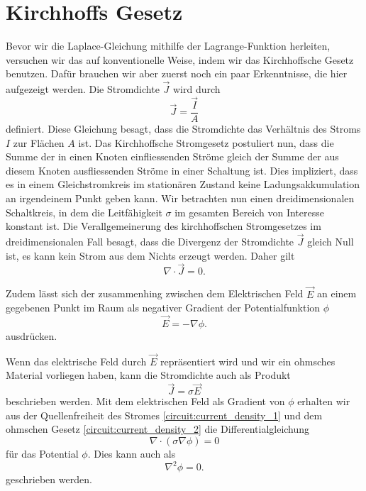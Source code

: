 %
%
%
%
\section{Kirchhoffs Gesetz
\label{circuit:section:teil1}}
Bevor wir die Laplace-Gleichung mithilfe der Lagrange-Funktion herleiten, versuchen wir das auf konventionelle Weise, indem wir  das Kirchhoffsche Gesetz benutzen. 
Dafür brauchen wir aber zuerst noch ein paar Erkenntnisse, die hier aufgezeigt werden. Die Stromdichte $\vec{J}$ wird durch
\begin{equation}
	\vec{J}=\frac{\vec{I}}{A}
	\label{circuit:current_density_3}
\end{equation}
definiert. Diese Gleichung besagt, dass die Stromdichte das Verhältnis des Stroms $I$ zur Flächen $A$ ist. 
Das Kirchhoffsche Stromgesetz postuliert nun, dass die Summe der in einen Knoten einfliessenden Ströme gleich der Summe der aus diesem Knoten ausfliessenden Ströme in einer Schaltung ist. Dies impliziert, dass es in einem Gleichstromkreis im stationären Zustand keine Ladungsakkumulation an irgendeinem Punkt geben kann. Wir betrachten nun einen dreidimensionalen Schaltkreis, in dem die Leitfähigkeit $\sigma$ im gesamten Bereich von Interesse konstant ist. Die Verallgemeinerung des kirchhoffschen Stromgesetzes im dreidimensionalen Fall besagt, dass die Divergenz der Stromdichte $\vec{J}$ gleich Null ist, es kann kein Strom aus dem Nichts erzeugt werden. Daher gilt 
\begin{equation}
	\nabla \cdot  \vec{J}=0.
	\label{circuit:current_density_1}
\end{equation}

Zudem lässt sich der zusammenhing zwischen dem Elektrischen Feld $\vec{E}$ an einem gegebenen Punkt im Raum als negativer Gradient der Potentialfunktion $\phi$ 
\begin{equation}
	\vec{E}=-\nabla \phi.
	\label{circuit:current_density_4}
\end{equation}
ausdrücken.

Wenn das elektrische Feld durch $\vec{E}$ repräsentiert wird und wir ein ohmsches Material vorliegen haben, kann die Stromdichte auch als Produkt  
\begin{equation}
\vec{J}=\sigma \vec{E}
\label{circuit:current_density_2}
\end{equation}
beschrieben werden.
Mit dem elektrischen Feld als Gradient von $\phi$ erhalten wir aus der Quellenfreiheit des Stromes \eqref{circuit:current_density_1} und dem ohmschen Gesetz \eqref{circuit:current_density_2} die Differentialgleichung 
\begin{equation}
	\nabla \cdot (\sigma \nabla \phi)=0
	\label{circuit:current_density_5}
\end{equation}
für das Potential $\phi$. Dies kann auch als
\begin{equation}
\nabla^2 \phi=0.
\label{circuit:current_density_6}
\end{equation}
geschrieben werden.

